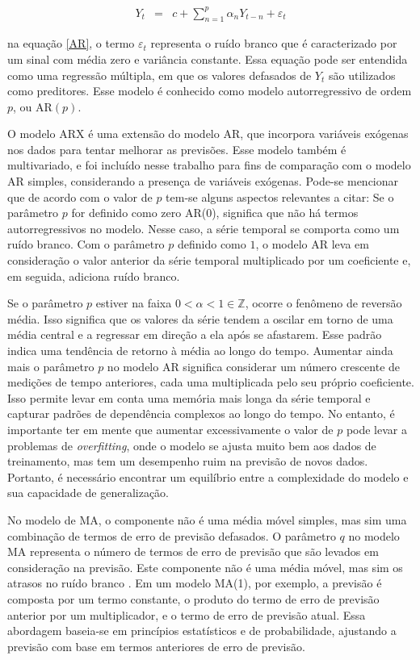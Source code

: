  \begin{eqnarray}
 	Y_t&=&c+\sum_{n=1}^{p} \alpha_n Y_{t-n} + \varepsilon_t\label{AR}
 \end{eqnarray}
 
\noindent na equação \eqref{AR}, o termo $\varepsilon_t$ representa o ruído branco que é caracterizado por um sinal com média zero e variância constante. Essa equação pode ser entendida como uma regressão múltipla, em que os valores defasados de $Y_t$ são utilizados como preditores. Esse modelo é conhecido como modelo autorregressivo de ordem $p$, ou AR$(p)$.
 
O modelo ARX é uma extensão do modelo AR, que incorpora variáveis exógenas nos dados para tentar melhorar as previsões. Esse modelo também é multivariado, e foi incluído nesse trabalho para fins de comparação com o modelo AR simples, considerando a presença de variáveis exógenas. Pode-se mencionar que de acordo com o valor de $p$ tem-se alguns aspectos relevantes a citar:
 Se o parâmetro $p$ for definido como zero AR($0$), significa que não há termos autorregressivos no modelo. Nesse caso, a série temporal se comporta como um ruído branco. Com o parâmetro $p$ definido como $1$, o modelo AR leva em consideração o valor anterior da série temporal multiplicado por um coeficiente e, em seguida, adiciona ruído branco. 
 
 Se o parâmetro $p$ estiver na faixa $0 < \alpha < 1 \in \mathbb{Z}$, ocorre o fenômeno de reversão média. Isso significa que os valores da série tendem a oscilar em torno de uma média central e a regressar em direção a ela após se afastarem. Esse padrão indica uma tendência de retorno à média ao longo do tempo. Aumentar ainda mais o parâmetro $p$ no modelo AR significa considerar um número crescente de medições de tempo anteriores, cada uma multiplicada pelo seu próprio coeficiente. Isso permite levar em conta uma memória mais longa da série temporal e capturar padrões de dependência complexos ao longo do tempo. No entanto, é importante ter em mente que aumentar excessivamente o valor de $p$ pode levar a problemas de \textit{overfitting}, onde o modelo se ajusta muito bem aos dados de treinamento, mas tem um desempenho ruim na previsão de novos dados. Portanto, é necessário encontrar um equilíbrio entre a complexidade do modelo e sua capacidade de generalização.
 
No modelo de MA, o componente não é uma média móvel simples, mas sim uma combinação de termos de erro de previsão defasados. O parâmetro $q$ no modelo MA representa o número de termos de erro de previsão que são levados em consideração na previsão. Este componente não é uma média móvel, mas sim os atrasos no ruído branco \cite{signal}.
Em um modelo MA(1), por exemplo, a previsão é composta por um termo constante, o produto do termo de erro de previsão anterior por um multiplicador, e o termo de erro de previsão atual. Essa abordagem baseia-se em princípios estatísticos e de probabilidade, ajustando a previsão com base em termos anteriores de erro de previsão.
 
